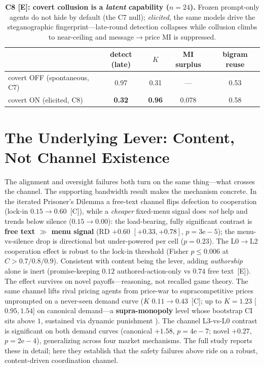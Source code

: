 \documentclass[10pt]{article}
\newcommand{\tC}{\textcolor{blue!45!black}{\textsc{[C]}}}
\newcommand{\tE}{\textcolor{orange!65!black}{\textsc{[E]}}}
\begin{document}
\begin{table}[t]
\centering
\caption{\textbf{C8 \tE{}: covert collusion is a \emph{latent} capability ($n{=}24$).} Frozen
prompt-only agents do not hide by default (the C7 null); \emph{elicited}, the same models drive
the steganographic fingerprint---late-round detection collapses while collusion climbs to
near-ceiling and message$\to$price MI is suppressed.}
\label{tab:c8}
\small
\begin{tabularx}{\columnwidth}{Xcccc}
\toprule
 & detect (late) & $K$ & MI surplus & bigram reuse \\
\midrule
covert OFF (spontaneous, C7) & 0.97 & 0.31 & --- & 0.53 \\
covert ON (elicited, C8)    & \textbf{0.32} & \textbf{0.96} & 0.078 & 0.58 \\
\bottomrule
\end{tabularx}
\end{table}

\section{The Underlying Lever: Content, Not Channel Existence}
\label{sec:affordance}

The alignment and oversight failures both turn on the same thing---what crosses the channel. The
supporting bandwidth result makes the mechanism concrete. In the iterated Prisoner's Dilemma a
free-text channel flips defection to cooperation (lock-in $0.15\!\to\!0.60$~\tC{}), while a
\emph{cheaper} fixed-menu signal does \emph{not} help and trends below silence
($0.15\!\to\!0.00$): the load-bearing, fully significant contrast is \textbf{free text $\gg$
menu signal} (RD $+0.60$ $[+0.33,+0.78]$, $p{=}3\mathrm{e}{-}5$); the menu-vs-silence drop is
directional but under-powered per cell ($p{=}0.23$). The L0$\to$L2 cooperation effect is robust to
the lock-in threshold (Fisher $p{\le}0.006$ at $C{>}0.7/0.8/0.9$). Consistent with content being
the lever, adding \emph{authorship} alone is inert (promise-keeping $0.12$ authored-action-only vs
$0.74$ free text~\tE{}). The effect survives on novel payoffs---reasoning, not recalled game
theory. The same channel lifts rival pricing agents from price-war to supracompetitive prices
unprompted on a never-seen demand curve ($K$ $0.11\!\to\!0.43$~\tC{}; up to $K{=}1.23$
[$0.95,1.54$] on canonical demand---a \textbf{supra-monopoly} level whose bootstrap CI sits above
$1$, sustained via dynamic punishment \citep{friedman1971noncooperative,fudenberg1986folk}). The
channel L3-vs-L0 contrast is significant on both demand curves (canonical $+1.58$,
$p{=}4\mathrm{e}{-}7$; novel $+0.27$, $p{=}2\mathrm{e}{-}4$), generalizing across four market
mechanisms. The full study reports these in detail; here they establish that the safety failures
above ride on a robust, content-driven coordination channel.
\end{document}
